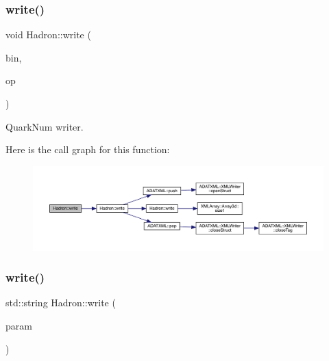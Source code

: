 \subsubsection{\texorpdfstring{write()}{write()}\hspace{0.1cm}{\footnotesize\ttfamily [13/95]}}
{\footnotesize\ttfamily void Hadron\+::write (\begin{DoxyParamCaption}\item[{\mbox{\hyperlink{classADATIO_1_1BinaryWriter}{Binary\+Writer}} \&}]{bin,  }\item[{const \mbox{\hyperlink{structHadron_1_1QuarkNum__t}{Quark\+Num\+\_\+t}} \&}]{op }\end{DoxyParamCaption})}



Quark\+Num writer. 

Here is the call graph for this function\+:\nopagebreak
\begin{figure}[H]
\begin{center}
\leavevmode
\includegraphics[width=350pt]{d1/daf/namespaceHadron_a44eb64f50cbbc947364a538026c97ee6_cgraph}
\end{center}
\end{figure}
\mbox{\label{namespaceHadron_a4af69bc389ee44d25d1f3efa30042e4c}} 
\subsubsection{\texorpdfstring{write()}{write()}\hspace{0.1cm}{\footnotesize\ttfamily [14/95]}}
{\footnotesize\ttfamily std\+::string Hadron\+::write (\begin{DoxyParamCaption}\item[{const \mbox{\hyperlink{structHadron_1_1KeyCGCSU3__t}{Key\+C\+G\+C\+S\+U3\+\_\+t}} \&}]{param }\end{DoxyParamCaption})}

\mbox{\label{namespaceHadron_a5dd8ceac99cd9e526324bf30fca8e225}} 
